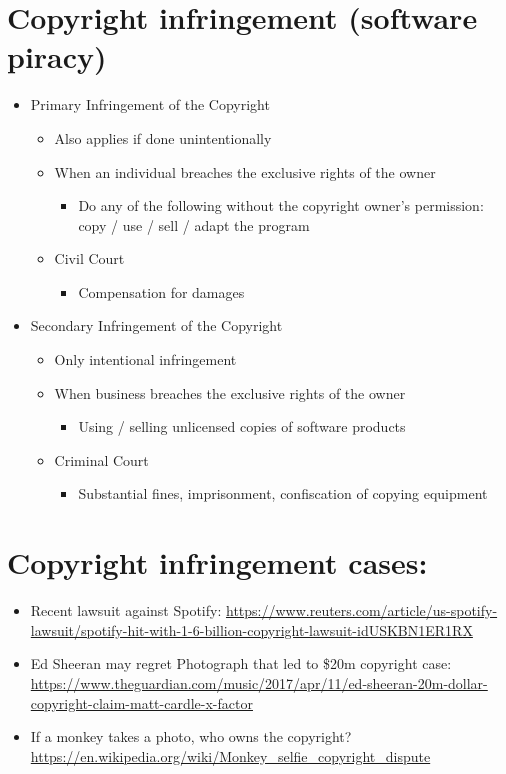 \documentclass{article}
\begin{document}
\section{Copyright infringement (software piracy)}
\begin{itemize}
\item Primary Infringement of the Copyright
\begin{itemize}
\item Also applies if done unintentionally
\item When an individual breaches the exclusive rights of the owner
\begin{itemize}
\item Do any of the following without the copyright owner's permission: copy / use / sell / adapt the program
\end{itemize}
\item Civil Court
\begin{itemize}
\item Compensation for damages
\end{itemize}
\end{itemize}
\item Secondary Infringement of the Copyright
\begin{itemize}
\item Only intentional infringement
\item When business breaches the exclusive rights of the owner
\begin{itemize}
\item Using / selling unlicensed copies of software products
\end{itemize}
\item Criminal Court
\begin{itemize}
\item Substantial fines, imprisonment, confiscation of copying equipment
\end{itemize}
\end{itemize}
\end{itemize}



\section{Copyright infringement cases:}
\begin{itemize}
\item Recent lawsuit against Spotify: \url{https://www.reuters.com/article/us-spotify-lawsuit/spotify-hit-with-1-6-billion-copyright-lawsuit-idUSKBN1ER1RX}
\item Ed Sheeran may regret Photograph that led to \$20m copyright case: \url{https://www.theguardian.com/music/2017/apr/11/ed-sheeran-20m-dollar-copyright-claim-matt-cardle-x-factor}
\item If a monkey takes a photo, who owns the copyright? \url{https://en.wikipedia.org/wiki/Monkey_selfie_copyright_dispute}
\end{itemize}
\end{document}
